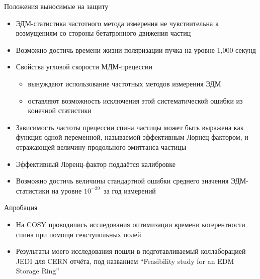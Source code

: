 \documentclass[14pt]{beamer}
\begin{document}
\begin{frame}{Положения выносимые на защиту}
	\begin{itemize}
		\item ЭДМ-статистика частотного метода измерения не чувствительна к возмущениям со стороны бетатронного движения частиц
		\item Возможно достичь времени жизни поляризации пучка на уровне 1,000 секунд
		\item Свойства угловой скорости МДМ-прецессии 
			\begin{itemize}
				\item вынуждают использование частотных методов измерения ЭДМ
				\item оставляют возможность исключения этой систематической ошибки из конечной статистики
			\end{itemize}
	\end{itemize}
\end{frame}
\begin{frame}
	\begin{itemize}
		\item Зависимость частоты прецессии спина частицы может быть выражена как функция одной переменной, называемой эффективным Лорнец-фактором, и отражающей величину продольного эмиттанса частицы
		\item Эффективный Лоренц-фактор поддаётся калибровке
		\item Возможно достичь величины стандартной ошибки среднего значения ЭДМ-статистики на уровне $10^{-29}$\ecm~за год измерений
	\end{itemize}
\end{frame}

\begin{frame}{Апробация}
	\begin{itemize}
		\item На COSY проводились исследования оптимизации времени когерентности спина при помощи секступольных полей
		\item Результаты моего исследования пошли в подготавливаемый коллаборацией JEDI для CERN отчёта, под названием ``Feasibility study for an EDM Storage Ring''
	\end{itemize}
\end{frame}
\end{document}
